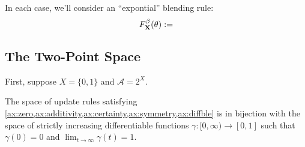 \documentclass{article}
\begin{document}
In each case, we'll consider an ``expontial'' blending rule:
\[
    F^{\beta}_{\mathbf{X}}(\theta) :=
\]



\subsection{The Two-Point Space}
First, suppose $X = \{0,1\}$ and $\mathcal A = 2^X$.

\begin{claim}
The space of update rules satisfying
\cref{ax:zero,ax:additivity,ax:certainty,ax:symmetry,ax:diffble}
is in bijection with the space of strictly increasing differentiable functions
$\gamma : [0,\infty) \to [0,1]$
such that
$\gamma(0) = 0$ and $\lim_{t\to\infty}\gamma(t) = 1$.
\end{claim}
\end{document}
